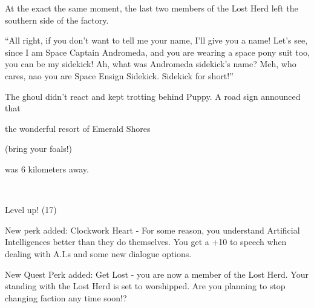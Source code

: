 At the exact the same moment, the last two members of the Lost Herd left the southern side of the factory.

``All right, if you don't want to tell me your name, I'll give you a name! Let's see, since I am Space Captain Andromeda, and you are wearing a space pony suit too, you can be my sidekick! Ah, what was Andromeda sidekick's name? Meh, who cares, nao you are Space Ensign Sidekick. Sidekick for short!''

The ghoul didn't react and kept trotting behind Puppy. A road sign announced that 

\begin{center}
	the wonderful resort of Emerald Shores 
	
	(bring your foals!) 
	
	was 6 kilometers away.
\end{center}


~\vfill


\begin{engnote}
		Level up! (17)
	
		New perk added: Clockwork Heart - For some reason, you understand Artificial Intelligences better than they do themselves. You get a +10 to speech when dealing with A.I.s and some new dialogue options.
	
		New Quest Perk added: Get Lost - you are now a member of the Lost Herd. Your standing with the Lost Herd is set to worshipped. Are you planning to stop changing faction any time soon!?
\end{engnote}

